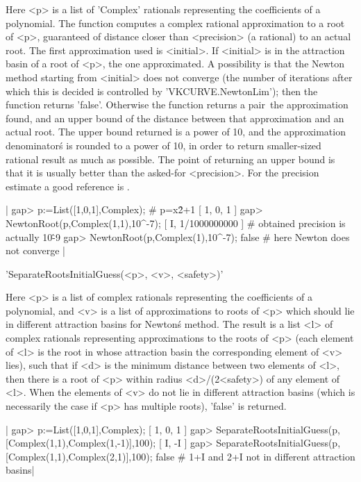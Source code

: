Here  <p> is a list of 'Complex' rationals representing the coefficients of
a  polynomial. The function computes a  complex rational approximation to a
root of <p>, guaranteed of distance closer than <precision> (a rational) to
an  actual root. The first approximation used is <initial>. If <initial> is
in  the  attraction  basin  of  a  root  of  <p>,  the  one approximated. A
possibility  is that  the Newton  method starting  from <initial>  does not
converge  (the  number  of  iterations  after  which  this  is  decided  is
controlled  by  'VKCURVE.NewtonLim');  then  the  function returns 'false'.
Otherwise  the function returns  a pair\:\ the  approximation found, and an
upper  bound of the distance between that approximation and an actual root.
The  upper  bound  returned  is  a  power  of  10,  and  the  approximation
denominator\'  s  is  rounded  to  a  power  of  10,  in  order  to  return
smaller-sized  rational result as much as  possible. The point of returning
an upper bound is that it is usually better than the asked-for <precision>.
For the precision estimate a good reference is \cite{HSS01}.

|    gap> p:=List([1,0,1],Complex); # p=x\^2+1
    [ 1, 0, 1 ]
    gap> NewtonRoot(p,Complex(1,1),10^-7);  
    [ I, 1/1000000000 ]
    # obtained precision is actually 10\^-9
    gap> NewtonRoot(p,Complex(1),10^-7); 
    false
    # here Newton does not converge
    |

%
%

'SeparateRootsInitialGuess(<p>, <v>, <safety>)'

Here <p> is a list of complex rationals representing the coefficients of
a polynomial, and <v> is a list  of approximations to roots of <p> which
should lie  in different  attraction basins for  Newton\' s  method. The
result is a list <l> of complex rationals representing approximations to
the roots of  <p> (each element of  <l> is the root  in whose attraction
basin the  corresponding element of <v>  lies), such that if  <d> is the
minimum distance  between two elements of  <l>, then there is  a root of
<p>  within radius  <d>/(2\*<safety>) of  any element  of <l>.  When the
elements of  <v> do  not lie  in different  attraction basins  (which is
necessarily the case if <p> has multiple roots), 'false' is returned.

|    gap> p:=List([1,0,1],Complex);
    [ 1, 0, 1 ]
    gap> SeparateRootsInitialGuess(p,[Complex(1,1),Complex(1,-1)],100);
    [ I, -I ]
    gap> SeparateRootsInitialGuess(p,[Complex(1,1),Complex(2,1)],100);
    false # 1+I and 2+I not in different attraction basins|

